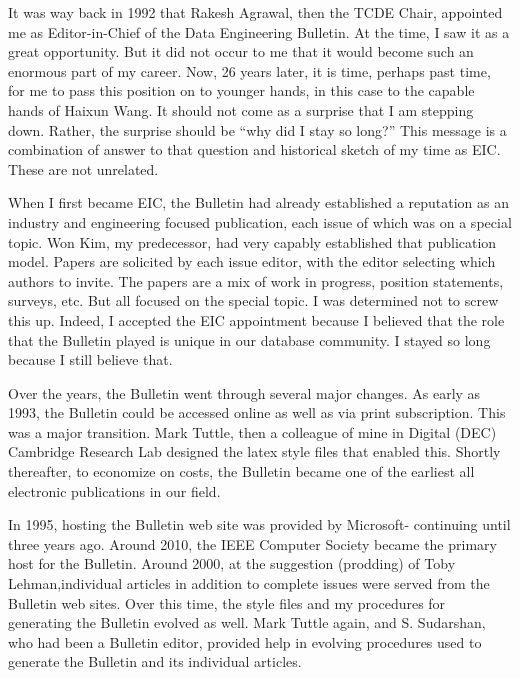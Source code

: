 \documentclass[11pt]{article}
\begin{document}

It was way back in 1992 that Rakesh Agrawal, then the TCDE Chair, appointed me as Editor-in-Chief of the Data Engineering Bulletin. At the time, I saw it as a great opportunity. But it did not occur to me that it would become such an enormous part of my career. Now, 26 years later, it is time, perhaps past time, for me to pass this position on to younger hands, in this case to the capable hands of Haixun Wang. It should not come as a surprise that I am stepping down. Rather, the surprise should be ``why did I stay so long?'' This message is a combination of answer to that question and historical sketch of my time as EIC. These are not unrelated.

When I first became EIC, the Bulletin had already established a reputation as an industry and engineering focused publication, each issue of which was on a special topic.  Won Kim, my predecessor, had very capably established that publication model. Papers are solicited by each issue editor, with the editor selecting which authors to invite. The papers are a mix of work in progress, position statements, surveys, etc. But all focused on the special topic. I was determined not to screw this up. Indeed, I accepted the EIC appointment because I believed that the role that the Bulletin played is unique in our database community.  I stayed so long because I still believe that.  

Over the years, the Bulletin went through several major changes. As early as 1993, the Bulletin could be accessed online as well as via print subscription. This was a major transition. Mark Tuttle, then a colleague of mine in Digital (DEC) Cambridge Research Lab designed the latex style files that enabled this. Shortly thereafter, to economize on costs, the Bulletin became one of the earliest all electronic publications in our field. 

In 1995, hosting the Bulletin web site was provided by Microsoft- continuing until three years ago. Around 2010, the IEEE Computer Society became the primary host for the Bulletin. Around 2000, at the suggestion (prodding) of Toby Lehman,individual articles in addition to complete issues were served from the Bulletin web sites. Over this time, the style files and my procedures for generating the Bulletin evolved as well. Mark Tuttle again, and S. Sudarshan, who had been a Bulletin editor, provided help in evolving procedures used to generate the Bulletin and its individual articles. 
\end{document}
